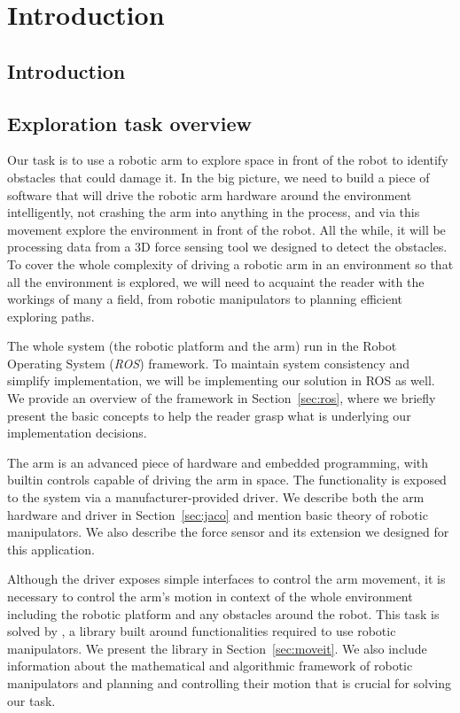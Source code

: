 \documentclass[buriama8_dp.tex]{subfiles}
\begin{document}
\chapter{Introduction}

\section{Introduction}


\section{Exploration task overview}
\label{sec:label}

Our task is to use a robotic arm to explore space in front of the robot to identify obstacles that could damage it. In the big picture, we need to build a piece of software that will drive the robotic arm hardware around the environment intelligently, not crashing the arm into anything in the process, and via this movement explore the environment in front of the robot. All the while, it will be processing data from a 3D force sensing tool we designed to detect the obstacles. To cover the whole complexity of driving a robotic arm in an environment so that all the environment is explored, we will need to acquaint the reader with the workings of many a field, from robotic manipulators to planning efficient exploring paths.

The whole system (the robotic platform and the arm) run in the Robot Operating System (\emph{ROS}) framework. To maintain system consistency and simplify implementation, we will be implementing our solution in ROS as well. We provide an overview of the framework in Section~\ref{sec:ros}, where we briefly present the basic concepts to help the reader grasp what is underlying our implementation decisions.

The arm is an advanced piece of hardware and embedded programming, with builtin controls capable of driving the arm in space. The functionality is exposed to the system via a manufacturer-provided driver. We describe both the arm hardware and driver in Section~\ref{sec:jaco} and mention basic theory of robotic manipulators. We also describe the force sensor and its extension we designed for this application. 

Although the driver exposes simple interfaces to control the arm movement, it is necessary to control the arm's motion in context of the whole environment including the robotic platform and any obstacles around the robot. This task is solved by , a library built around functionalities required to use robotic manipulators. We present the library in Section~\ref{sec:moveit}. We also include information about the mathematical and algorithmic framework of robotic manipulators and planning and controlling their motion that is crucial for solving our task.
\end{document}

